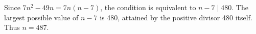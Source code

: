 Since $ 7n^2-49n=7n(n-7)$, the condition is equivalent to $ n-7\mid480 $. The largest possible value of $ n-7 $ is 480, attained by the positive divisor 480 itself. Thus $\boxed{n=487}$.
